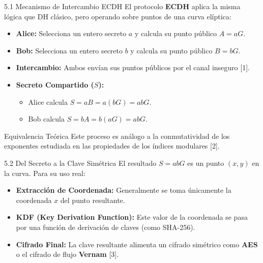 \documentclass{beamer}
\begin{document}
\begin{frame}{5.1 Mecanismo de Intercambio ECDH}
    El protocolo \textbf{ECDH} aplica la misma lógica que DH clásico, pero operando sobre puntos de una curva elíptica:
    \begin{itemize}
        \item \textbf{Alice:} Selecciona un entero secreto $a$ y calcula su punto público $A = aG$.
        \item \textbf{Bob:} Selecciona un entero secreto $b$ y calcula su punto público $B = bG$.
        \item \textbf{Intercambio:} Ambos envían sus puntos públicos por el canal inseguro [1].
        \item \textbf{Secreto Compartido ($S$):}
        \begin{itemize}
            \item Alice calcula $S = aB = a(bG) = abG$.
            \item Bob calcula $S = bA = b(aG) = abG$.
        \end{itemize}
    \end{itemize}
    \begin{block}{Equivalencia Teórica}
        Este proceso es análogo a la conmutatividad de los exponentes estudiada en las propiedades de los índices modulares [2].
    \end{block}
\end{frame}

\begin{frame}{5.2 Del Secreto a la Clave Simétrica}
    El resultado $S = abG$ es un punto $(x, y)$ en la curva. Para su uso real:
    \begin{itemize}
        \item \textbf{Extracción de Coordenada:} Generalmente se toma únicamente la coordenada $x$ del punto resultante.
        \item \textbf{KDF (Key Derivation Function):} Este valor de la coordenada se pasa por una función de derivación de claves (como SHA-256).
        \item \textbf{Cifrado Final:} La clave resultante alimenta un cifrado simétrico como \textbf{AES} o el cifrado de flujo \textbf{Vernam} [3].
    \end{itemize}
\end{frame}
\end{document}
